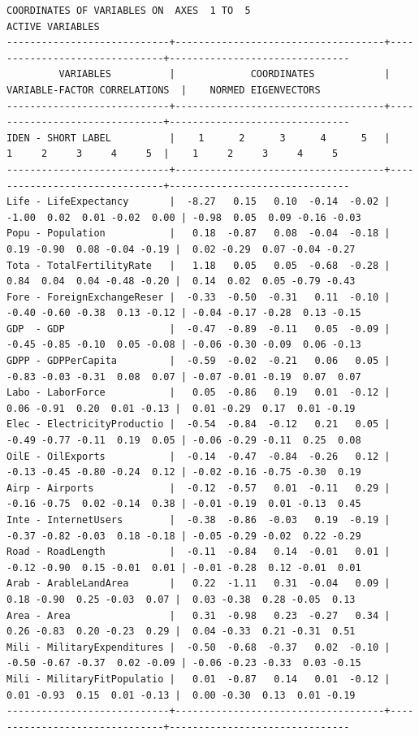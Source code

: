 \documentclass[a4paper,10pt,twocolumn]{article}
\begin{document}
\begin{landscape}
\begin{verbatim}
COORDINATES OF VARIABLES ON  AXES  1 TO  5
ACTIVE VARIABLES
----------------------------+------------------------------------+-------------------------------+-------------------------------
         VARIABLES          |             COORDINATES            | VARIABLE-FACTOR CORRELATIONS  |    NORMED EIGENVECTORS
----------------------------+------------------------------------+-------------------------------+-------------------------------
IDEN - SHORT LABEL          |    1      2      3      4      5   |    1     2     3     4     5  |    1     2     3     4     5
----------------------------+------------------------------------+-------------------------------+-------------------------------
Life - LifeExpectancy       |  -8.27   0.15   0.10  -0.14  -0.02 | -1.00  0.02  0.01 -0.02  0.00 | -0.98  0.05  0.09 -0.16 -0.03
Popu - Population           |   0.18  -0.87   0.08  -0.04  -0.18 |  0.19 -0.90  0.08 -0.04 -0.19 |  0.02 -0.29  0.07 -0.04 -0.27
Tota - TotalFertilityRate   |   1.18   0.05   0.05  -0.68  -0.28 |  0.84  0.04  0.04 -0.48 -0.20 |  0.14  0.02  0.05 -0.79 -0.43
Fore - ForeignExchangeReser |  -0.33  -0.50  -0.31   0.11  -0.10 | -0.40 -0.60 -0.38  0.13 -0.12 | -0.04 -0.17 -0.28  0.13 -0.15
GDP  - GDP                  |  -0.47  -0.89  -0.11   0.05  -0.09 | -0.45 -0.85 -0.10  0.05 -0.08 | -0.06 -0.30 -0.09  0.06 -0.13
GDPP - GDPPerCapita         |  -0.59  -0.02  -0.21   0.06   0.05 | -0.83 -0.03 -0.31  0.08  0.07 | -0.07 -0.01 -0.19  0.07  0.07
Labo - LaborForce           |   0.05  -0.86   0.19   0.01  -0.12 |  0.06 -0.91  0.20  0.01 -0.13 |  0.01 -0.29  0.17  0.01 -0.19
Elec - ElectricityProductio |  -0.54  -0.84  -0.12   0.21   0.05 | -0.49 -0.77 -0.11  0.19  0.05 | -0.06 -0.29 -0.11  0.25  0.08
OilE - OilExports           |  -0.14  -0.47  -0.84  -0.26   0.12 | -0.13 -0.45 -0.80 -0.24  0.12 | -0.02 -0.16 -0.75 -0.30  0.19
Airp - Airports             |  -0.12  -0.57   0.01  -0.11   0.29 | -0.16 -0.75  0.02 -0.14  0.38 | -0.01 -0.19  0.01 -0.13  0.45
Inte - InternetUsers        |  -0.38  -0.86  -0.03   0.19  -0.19 | -0.37 -0.82 -0.03  0.18 -0.18 | -0.05 -0.29 -0.02  0.22 -0.29
Road - RoadLength           |  -0.11  -0.84   0.14  -0.01   0.01 | -0.12 -0.90  0.15 -0.01  0.01 | -0.01 -0.28  0.12 -0.01  0.01
Arab - ArableLandArea       |   0.22  -1.11   0.31  -0.04   0.09 |  0.18 -0.90  0.25 -0.03  0.07 |  0.03 -0.38  0.28 -0.05  0.13
Area - Area                 |   0.31  -0.98   0.23  -0.27   0.34 |  0.26 -0.83  0.20 -0.23  0.29 |  0.04 -0.33  0.21 -0.31  0.51
Mili - MilitaryExpenditures |  -0.50  -0.68  -0.37   0.02  -0.10 | -0.50 -0.67 -0.37  0.02 -0.09 | -0.06 -0.23 -0.33  0.03 -0.15
Mili - MilitaryFitPopulatio |   0.01  -0.87   0.14   0.01  -0.12 |  0.01 -0.93  0.15  0.01 -0.13 |  0.00 -0.30  0.13  0.01 -0.19
----------------------------+------------------------------------+-------------------------------+-------------------------------


\end{verbatim}
\end{landscape}
\end{document}
